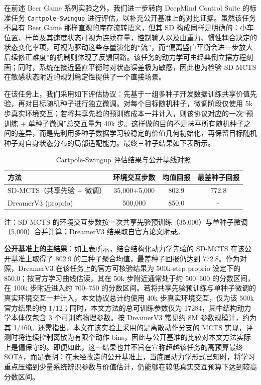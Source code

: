 \documentclass[UTF8]{ctexart}
\begin{document}
在前述 Beer Game 系列实验之外，我们进一步转向 DeepMind Control Suite 的标准任务 \texttt{Cartpole-Swingup}
进行评估，以补充公开基准上的对比证据。虽然该任务不具有 Beer Game 那样直观的库存流转语义，但其 SD 构成同样是明确的：小车位置、杆角及其速度状态可视为连续存量，控制输入以及由重力、惯性耦合决定的状态变化率项，可视为驱动这些存量演化的“流”，而“偏离竖直平衡会进一步放大后续修正难度”的机制则体现了反馈回路。该任务的动力学可由经典倒立摆方程刻画；同时，系统在接近竖直平衡时对状态误差极为敏感，因此也为检验
SD-MCTS 在敏感状态附近的规划稳定性提供了一个直接场景。

在该任务上，我们采用如下评估协议：先基于一组多种子开发数据训练共享价值先验，再对目标随机种子进行独立微调。对每个目标随机种子，微调阶段仅使用
5k 步真实环境交互；若将共享先验的预训练成本一并计入，则该协议对应的一次``预训练
+ 单种子微调''总交互量为 40k
步。这样做的目的不是抹平所有随机种子之间的差异，而是先利用多种子数据学习较稳定的价值几何初始化，再保留目标随机种子对自身状态分布的局部适配能力。最终三种子结果如下表所示。

\begin{table}[ht]
\centering
\caption{Cartpole-Swingup 评估结果与公开基线对照}
\begin{tabular}{l c c c}
\toprule
方法 & 环境交互步数 & 均值回报 & 最差种子回报 \\
\midrule
SD-MCTS（共享先验 + 微调） & 35,000+5,000 & 802.9 & 772.8 \\
DreamerV3 (proprio) & 500,000 & 850.0 & - \\
\bottomrule
\end{tabular}
\par\smallskip
{\small 注：SD-MCTS 的环境交互步数按一次共享先验预训练（35,000）与单种子微调（5,000）合并计算；DreamerV3 结果取自官方论文附录。}
\end{table}

\textbf{公开基准上的主结果}：如上表所示，结合结构化动力学先验的
SD-MCTS 在该公开基准上取得了 802.9 的三种子聚合均值，最差种子回报仍达到
772.8。作为对照，DreamerV3 在该任务上的官方可核验结果为 500k-step proprio 设定下的
850.0；按官方学习曲线估读，其在 50k 步附近通常处于约 500--600
的分数区间，在 100k 步附近进入约 700--750 的分数区间。若将共享先验预训练与单种子微调的真实环境交互一并计入，本文协议总计约使用
40k 步真实环境交互，仅为该 500k 官方结果的约
1/12；同时，本文方法的总可训练参数仅为 17284，其中结构动力学本体仅包含 3 个可训练物理参数。按
DreamerV3 常见约 8M 参数规模计，约为其
1/460。还需指出，本文在该实验上采用的是离散动作分支的 MCTS 实现，评测时将连续控制离散为有限个动作 bins，因此与公开基准的比较对本文方法实际上是偏保守的。即便如此，这一结果也并不旨在宣称超越该任务的高预算最终 SOTA，而是表明：在未经改造的公开基准上，当底层动力学形式已知时，将学习重点压缩到少量系统辨识参数与价值估计，仍能够在较低真实交互预算下达到较高分数区间。
\end{document}

